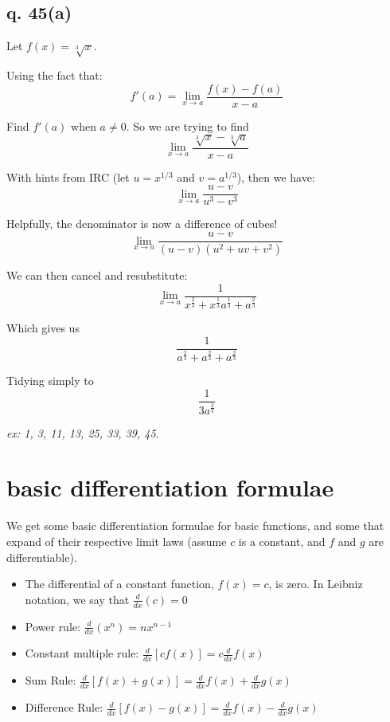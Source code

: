\documentclass[10pt,a4paper]{report}
\begin{document}
\subsection{q. 45(a)}

Let $f(x) = \sqrt[3]{x}$.

Using the fact that:
$$
  f'(a) = \lim_{x \to a} \frac{f(x) - f(a)}{x - a}
$$

Find $f'(a)$ when $a \ne 0$. So we are trying to find
$$
	\lim_{x \to a} \frac{\sqrt[3]{x} - \sqrt[3]{a}}{x - a}
$$

With hints from IRC (let $u = x^{1/3}$ and $v = a^{1/3}$), then we have:
$$
  \lim_{x \to a} \frac{u - v}{u^3 - v^3}
$$

Helpfully, the denominator is now a difference of cubes!
$$
  \lim_{x \to a} \frac{u - v}{(u - v)(u^2 + uv + v^2)}
$$

We can then cancel and resubstitute:
$$
  \lim_{x \to a} \frac{1}{x^{\frac{2}{3}} + x^{\frac{1}{3}}a^{\frac{1}{3}} + a^{\frac{2}{3}}}
$$

Which gives us
$$
  \frac{1}{a^{\frac{2}{3}} + a^{\frac{2}{3}} + a^{\frac{2}{3}}}
$$

Tidying simply to
$$
	\frac{1}{3a^{\frac{2}{3}}}
$$

\emph{ex: 1, 3, 11, 13, 25, 33, 39, 45.}

\pagebreak[4]

\section{basic differentiation formulae}

We get some basic differentiation formulae for basic functions, and some that expand of their respective limit laws (assume $c$ is a constant, and $f$ and $g$ are differentiable).

\begin{itemize}
	\item The differential of a constant function, $f(x) = c$, is zero. In Leibniz notation, we say that $\frac{d}{dx} (c) = 0$
	\item Power rule: $\frac{d}{dx} (x^n) = nx^{n - 1}$
	\item Constant multiple rule: $\frac{d}{dx} [cf(x)] = c \frac{d}{dx} f(x)$
	\item Sum Rule: $\frac{d}{dx}[f(x) + g(x)] = \frac{d}{dx} f(x) + \frac{d}{dx} g(x)$
	\item Difference Rule: $\frac{d}{dx}[f(x) - g(x)] = \frac{d}{dx} f(x) - \frac{d}{dx} g(x)$
\end{itemize}
\end{document}
